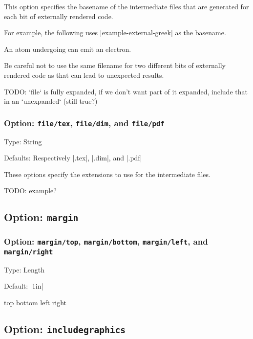 \documentclass[10pt]{ltxdoc}
\newcommand{\opt}[1]{\texttt{#1}}
\begin{document}
This option specifies the basename of the intermediate files that are
generated for each bit of externally rendered code.

For example, the following uses |example-external-greek| as the
basename.

\begin{tcblisting}{}
An atom undergoing
can emit an electron.
\end{tcblisting}

Be careful not to use the same filename for two different bits of
externally rendered code as that can lead to unexpected results.

TODO: `file` is fully expanded, if we don't want part of it expanded, include that in an `unexpanded` (still true?)

\subsubsection{Option: \opt{file/tex}, \opt{file/dim}, and \opt{file/pdf}}

Type: String

Defaults: Respectively |.tex|, |.dim|, and |.pdf|

These options specify the extensions to use for the intermediate files.

TODO: example?

\subsection{Option: \opt{margin}}
\label{subsec:margin}

\subsubsection{Option: \opt{margin/top}, \opt{margin/bottom}, \opt{margin/left}, and \opt{margin/right}}
\label{subsubsec:margin/top, margin/bottom, margin/left, and margin/right}

Type: Length

Default: |1in|

top
bottom
left
right

\subsection{Option: \opt{includegraphics}}
\label{subsec:includegraphics}
\end{document}
